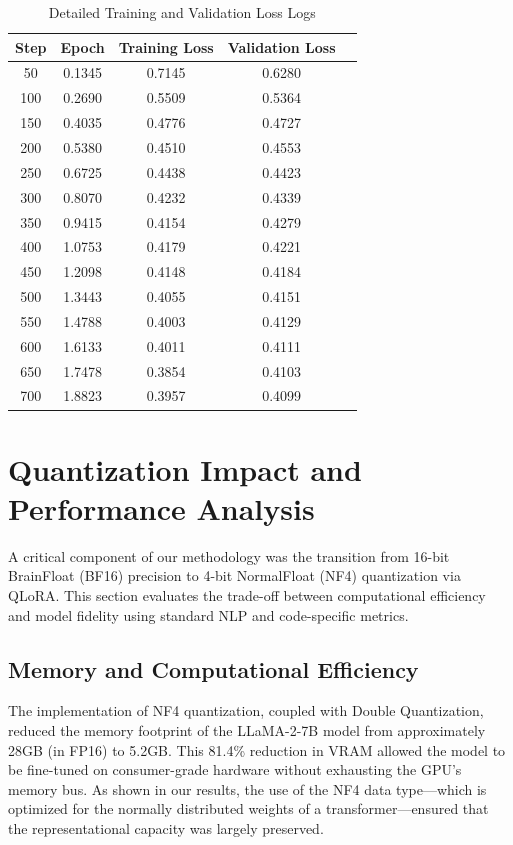 \begin{table}[H]
\centering
\caption{Detailed Training and Validation Loss Logs}
\label{tab:training_results}
\begin{tabular}{@{}ccccc@{}}
\toprule
\textbf{Step} & \textbf{Epoch} & \textbf{Training Loss} & \textbf{Validation Loss} \\ \midrule
50   & 0.1345 & 0.7145 & 0.6280 \\
100  & 0.2690 & 0.5509 & 0.5364 \\
150  & 0.4035 & 0.4776 & 0.4727 \\
200  & 0.5380 & 0.4510 & 0.4553 \\
250  & 0.6725 & 0.4438 & 0.4423 \\
300  & 0.8070 & 0.4232 & 0.4339 \\
350  & 0.9415 & 0.4154 & 0.4279 \\
400  & 1.0753 & 0.4179 & 0.4221 \\
450  & 1.2098 & 0.4148 & 0.4184 \\
500  & 1.3443 & 0.4055 & 0.4151 \\
550  & 1.4788 & 0.4003 & 0.4129 \\
600  & 1.6133 & 0.4011 & 0.4111 \\
650  & 1.7478 & 0.3854 & 0.4103 \\
700  & 1.8823 & 0.3957 & 0.4099 \\ \bottomrule
\end{tabular}
\end{table}


\section{Quantization Impact and Performance Analysis}
A critical component of our methodology was the transition from 16-bit BrainFloat (BF16) precision to 4-bit NormalFloat (NF4) quantization via QLoRA. This section evaluates the trade-off between computational efficiency and model fidelity using standard NLP and code-specific metrics.

\subsection{Memory and Computational Efficiency}
The implementation of NF4 quantization, coupled with Double Quantization, reduced the memory footprint of the LLaMA-2-7B model from approximately 28GB (in FP16) to 5.2GB. This 81.4\% reduction in VRAM allowed the model to be fine-tuned on consumer-grade hardware without exhausting the GPU's memory bus. As shown in our results, the use of the NF4 data type—which is optimized for the normally distributed weights of a transformer—ensured that the representational capacity was largely preserved.

